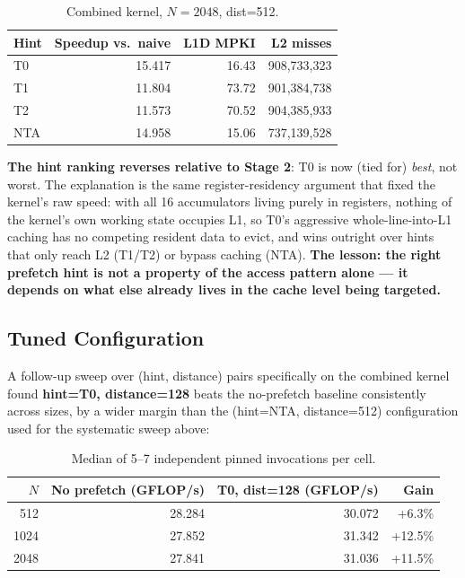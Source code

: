 \documentclass[11pt]{article}
\begin{document}
\begin{table}[h]
\centering
\begin{tabular}{l r r r}
\toprule
Hint & {Speedup vs.\ naive} & {L1D MPKI} & {L2 misses} \\
\midrule
T0  & 15.417 & 16.43 & 908{,}733{,}323 \\
T1  & 11.804 & 73.72 & 901{,}384{,}738 \\
T2  & 11.573 & 70.52 & 904{,}385{,}933 \\
NTA & 14.958 & 15.06 & 737{,}139{,}528 \\
\bottomrule
\end{tabular}
\caption{Combined kernel, $N{=}2048$, dist=512.}
\end{table}

\textbf{The hint ranking reverses relative to Stage 2}: T0 is now (tied for) \emph{best},
not worst. The explanation is the same register-residency argument that fixed the
kernel's raw speed: with all 16 accumulators living purely in registers, nothing of the
kernel's own working state occupies L1, so T0's aggressive whole-line-into-L1 caching has
no competing resident data to evict, and wins outright over hints that only reach L2
(T1/T2) or bypass caching (NTA). \textbf{The lesson: the right prefetch hint is not a
property of the access pattern alone --- it depends on what else already lives in the
cache level being targeted.}

\subsection{Tuned Configuration}
\label{sec:2c-tuned}

A follow-up sweep over (hint, distance) pairs specifically on the combined kernel found
\textbf{hint=T0, distance=128} beats the no-prefetch baseline consistently across sizes,
by a wider margin than the (hint=NTA, distance=512) configuration used for the systematic
sweep above:

\begin{table}[h]
\centering
\begin{tabular}{r r r r}
\toprule
$N$ & {No prefetch (GFLOP/s)} & {T0, dist=128 (GFLOP/s)} & {Gain} \\
\midrule
512  & 28.284 & 30.072 & +6.3\% \\
1024 & 27.852 & 31.342 & +12.5\% \\
2048 & 27.841 & 31.036 & +11.5\% \\
\bottomrule
\end{tabular}
\caption{Median of 5--7 independent pinned invocations per cell.}
\end{table}
\end{document}
